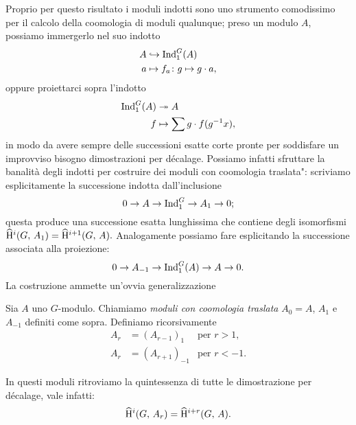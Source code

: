 Proprio per questo risultato i moduli indotti sono uno strumento comodissimo per il calcolo della coomologia di moduli qualunque; preso un modulo $ A $, possiamo immergerlo nel suo indotto
\begin{align*}
	A &\hookrightarrow \operatorname{Ind}_1^G(A) \\
	a & \mapsto f_a \colon g \mapsto g \cdot a, \end{align*} 
oppure proiettarci sopra l'indotto
\begin{align*}
	\operatorname{Ind}_1^G(A) &\twoheadrightarrow A  \\
	f & \mapsto \sum g \cdot f(g^{-1}x),
\end{align*}
in modo da avere sempre delle successioni esatte corte pronte per soddisfare un improvviso bisogno dimostrazioni per décalage. Possiamo infatti sfruttare la banalità degli indotti per costruire dei moduli con coomologia \leftquote traslata": scriviamo esplicitamente la successione indotta dall'inclusione
\[ 0 \to A \to \operatorname{Ind}_1^G \to A_1 \to 0; \]
questa produce una successione esatta lunghissima che contiene degli isomorfismi
$ \operatorname{\widehat{H}^\mathnormal{i}}(G, \, A_1) = \operatorname{\widehat{H}^{\mathnormal{i}+1}}(G, \, A). $
Analogamente possiamo fare esplicitando la successione associata alla proiezione:
\[ 0 \to A_{-1} \to \operatorname{Ind}_1^G(A) \to A \to 0. \]
La costruzione ammette un'ovvia generalizzazione
\begin{definition}
	Sia $ A $ uno $ G $-modulo. Chiamiamo \emph{moduli con coomologia traslata} $ A_0 = A $, $ A_1 $ e $ A_{-1} $ definiti come sopra. Definiamo ricorsivamente
	\begin{align*}
		A_r & = (A_{r-1})_1 & \text{per  }  r > 1, \\
		A_r & = (A_{r+1})_{-1} &\text{per  } r < -1.
	\end{align*}
\end{definition}

In questi moduli ritroviamo la quintessenza di tutte le dimostrazione per décalage, vale infatti:
\begin{equation}\label{traslati}
\operatorname{\widehat{H}^\mathnormal{i}}(G, \, A_r) = \operatorname{\widehat{H}^{\mathnormal{i+r}}}(G, \, A).
\end{equation}
